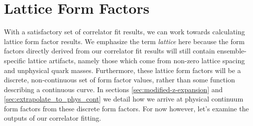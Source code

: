 
\section{Lattice Form Factors}\label{sec:constructing_form_factors}
With a satisfactory set of correlator fit results, we can work towards calculating lattice form factor results.  We emphasize the term \textit{lattice} here because the form factors directly derived from our correlator fit results will still contain ensemble-specific lattice artifacts, namely those which come from non-zero lattice spacing and unphysical quark masses.  Furthermore, these lattice form factors will be a discrete, non-continuous set of form factor values, rather than some function describing a continuous curve.  In sections \ref{sec:modified-z-expansion} and \ref{sec:extrapolate_to_phys_cont} we detail how we arrive at physical continuum form factors from these discrete form factors.  For now however, let's examine the outputs of our correlator fitting.

